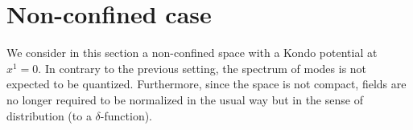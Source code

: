 \section{Non-confined case}\label{vacuum-without_bdy}
We consider in this section a non-confined space with a Kondo potential at $x^1 = 0$.
In contrary to the previous setting, the spectrum of modes is not expected to be quantized.
Furthermore, since the space is not compact, fields are no longer required to be normalized in the usual way but in the sense of distribution (to a $\delta$-function). 


